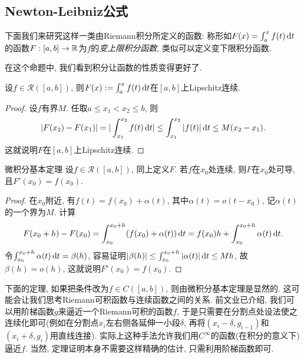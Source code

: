 \subsection{Newton-Leibniz公式}

下面我们来研究这样一类由Riemann积分所定义的函数: 称形如$F(x)=\int_a^x f(t) \mathop{}\!\mathrm{d} t$的函数$F:[a,b] \to \mathbb{R}$为$f$的\textit{变上限积分函数}, 类似可以定义变下限积分函数. 

在这个命题中, 我们看到积分让函数的性质变得更好了. 

\begin{proposition}{} \label{pro:jiffvgze}
	设$f \in \mathcal{R}([a,b])$, 则$F(x):=\int_a^x f(t) \mathop{}\!\mathrm{d} t$在$[a,b]$上Lipschitz连续. 
\end{proposition}
\begin{proof}
	设$f$有界$M$. 任取$a \leq x_1 < x_2 \leq b$, 则$$|F(x_2)-F(x_1)| = |\int_{x_1}^{x_2} f(t) \mathop{}\!\mathrm{d} t| \leq \int_{x_1}^{x_2} |f(t)| \mathop{}\!\mathrm{d} t \leq M(x_2-x_1).$$
	这就说明$F$在$[a,b]$上Lipschitz连续. 
\end{proof}

\begin{theorem}{微积分基本定理}
	设$f \in \mathcal{R}([a,b])$, 同上定义$F$. 若$f$在$x_0$处连续, 则$F$在$x_0$处可导, 且$F'(x_0)=f(x_0)$. 
\end{theorem}
\begin{proof}
	在$x_0$附近, 有$f(t)=f(x_0)+\alpha (t)$, 其中$\alpha (t)=o(t-x_0)$, 记$\alpha (t)$的一个界为$M$. 计算$$F(x_0+h)-F(x_0)=\int_{x_0}^{x_0+h} (f(x_0)+\alpha (t)) \mathop{}\!\mathrm{d} t = f(x_0)h+\int_{x_0}^{x_0+h} \alpha (t) \mathop{}\!\mathrm{d} t.$$
	令$\int_{x_0}^{x_0+h}\alpha (t) \mathop{}\!\mathrm{d} t=\beta (h)$, 容易证明$|\beta (h)| \leq \int_{x_0}^{x_0+h} |\alpha (t)| \mathop{}\!\mathrm{d} t \leq Mh$, 故$\beta (h)=o(h)$, 这就说明$F'(x_0)=f(x_0)$. 
\end{proof}

下面的定理, 如果把条件改为$f \in C([a,b])$, 则由微积分基本定理是显然的. 这可能会让我们思考Riemann可积函数与连续函数之间的关系. 前文业已介绍, 我们可以用阶梯函数$g$来逼近一个Riemann可积的函数$f$, 于是只需要在分割点处设法使之连续化即可(例如在分割点$x_i$左右侧各延伸一小段$\delta$, 再将$(x_i-\delta ,g_{i-1})$和$(x_i+\delta ,g_{i})$用直线连接). 实际上这种手法允许我们用$C^{\infty}$的函数(在积分的意义下)逼近$f$. 当然, 定理证明本身不需要这样精确的估计, 只需利用阶梯函数即可. 

